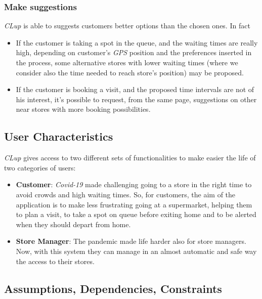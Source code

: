 \documentclass{article}
\begin{document}
		\subsubsection{Make suggestions}
		\emph{CLup} is able to suggests customers better options than the chosen ones. In fact
		\begin{itemize}
			\item If the customer is taking a spot in the queue, and the waiting times are really high, depending on customer's \emph{GPS} position and the preferences inserted in the process, some alternative stores with lower waiting times (where we consider also the time needed to reach store's position) may be proposed.
			\item If the customer is booking a visit, and the proposed time intervals are not of his interest, it's possible to request, from the same page, suggestions on other near stores with more booking possibilities.
		\end{itemize}

	\bigskip
	
	\subsection{User Characteristics}
	
	\emph{CLup} gives access to two different sets of functionalities to make easier the life of two categories of users:
	
	\bigskip
	\begin{itemize}
		
		\item {\bfseries Customer}: \emph{Covid-19} made challenging going to a store in the right time to avoid crowds and high waiting times. So, for customers, the aim of the application is to make less frustrating going at a supermarket, helping them to plan a visit, to take a spot on queue before exiting home and to be alerted when they should depart from home. \\
		
		\item {\bfseries Store Manager}: The pandemic made life harder also for store managers. Now, with this system they can manage in an almost automatic and safe way the access to their stores. \\
		
	\end{itemize}

	\subsection{Assumptions, Dependencies, Constraints}
	
\end{document}
